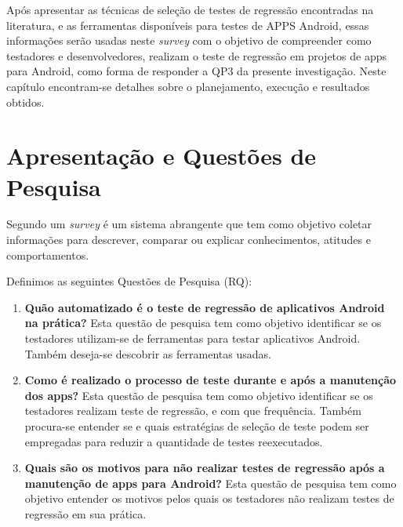 \acresetall 

Após apresentar as técnicas de seleção de testes de regressão encontradas na literatura, e as ferramentas disponíveis para testes de \ac{APPS} Android, essas informações serão usadas neste \textit{survey} com o objetivo de compreender como testadores e desenvolvedores, realizam o teste de regressão em projetos de apps para Android, como forma de responder a QP3 da presente investigação. Neste capítulo encontram-se detalhes sobre o planejamento, execução e resultados obtidos.


\section{Apresentação e Questões de Pesquisa}\label{rqsurvey}

Segundo \cite{PSK2001} um \textit{survey} é um sistema abrangente que tem como objetivo coletar informações para descrever, comparar ou explicar conhecimentos, atitudes e comportamentos. %

Definimos as seguintes Questões de Pesquisa (RQ):

\begin{enumerate}[label=\bf QP\arabic*,leftmargin=1.8cm]
    
    \item \textbf{Quão automatizado é o teste de regressão de aplicativos Android na prática?} Esta questão de pesquisa tem como objetivo identificar se os testadores utilizam-se de ferramentas para testar aplicativos Android. Também deseja-se descobrir as ferramentas usadas.
    
    \item \textbf{Como é realizado o processo de teste durante e após a manutenção dos apps?} Esta questão de pesquisa tem como objetivo identificar se os testadores realizam teste de regressão, e com que frequência. Também procura-se entender se e quais estratégias de seleção de teste podem ser empregadas para reduzir a quantidade de testes reexecutados.
    
    \item \textbf{Quais são os motivos para não realizar testes de regressão após a manutenção de apps para Android?} Esta questão de pesquisa tem como objetivo entender os motivos pelos quais os testadores não realizam testes de regressão em sua prática.
    
\end{enumerate}

